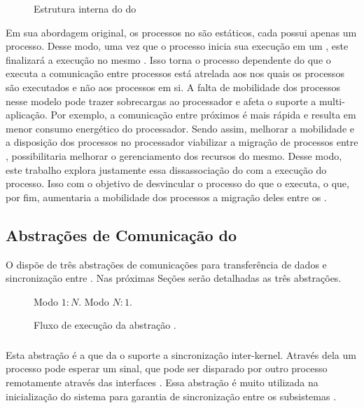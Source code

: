 \begin{figure}[bt]
    \centering
    
    \caption{Estrutura interna do \microkernel do \nanvix \cite{penna:thesis}}\label{fig.microkernel-overview}
\end{figure}

Em sua abordagem original, os processos no \nanvix são estáticos, \ie cada \cluster possui apenas um processo. Desse modo, uma vez que o processo inicia sua execução em um \cluster, este finalizará a execução no mesmo \cluster. 
Isso torna o processo dependente do \cluster que o executa \eg a comunicação entre processos está atrelada aos \clusters nos quais os processos são executados e não aos processos em si. A falta de mobilidade dos processos nesse modelo pode trazer sobrecargas ao processador e afeta o suporte a multi-aplicação. Por exemplo, a comunicação entre \clusters próximos é mais rápida e resulta em menor consumo energético do processador. Sendo assim, melhorar a mobilidade e a disposição dos processos no processador \ie viabilizar a migração de processos entre \clusters, possibilitaria melhorar o gerenciamento dos recursos do mesmo. Desse modo, este trabalho explora justamente essa dissassociação do \hardware com a execução do processo. Isso com o objetivo de desvincular o processo do \cluster que o executa, o que, por fim, aumentaria a mobilidade dos processos \ie a migração deles entre os \clusters.

\subsection{Abstrações de Comunicação do \nanvix}
O \nanvix dispõe de três abstrações de comunicações para transferência de dados e sincronização entre \clusters \cite{penna:thesis}. Nas próximas Seções serão detalhadas as três abstrações.

\begin{figure}[tb]
	\centering
                   {Modo $1:N$.}
                   {}
	\qquad
                   {Modo $N:1$.}
                   {}
	\caption{Fluxo de execução da abstração \sync \cite{penna:thesis}.\label{fig.sync}}
\end{figure}

\subsubsection{\sync}
Esta abstração é a que da o suporte a sincronização inter-kernel. Através dela um processo pode esperar um sinal, que pode ser disparado por outro processo remotamente através das interfaces \noc. Essa abstração é muito utilizada na inicialização do sistema para garantia de sincronização entre os subsistemas \cite{penna:thesis}.

